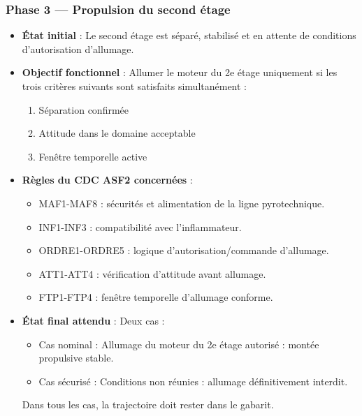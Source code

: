 \subsubsection*{Phase 3 — Propulsion du second étage}
\begin{itemize}
    \item \textbf{État initial} : Le second étage est séparé, stabilisé et en attente de conditions d’autorisation d’allumage.
    \item \textbf{Objectif fonctionnel} : Allumer le moteur du 2e étage uniquement si les trois critères suivants sont
    satisfaits simultanément :
    \begin{enumerate}
        \item Séparation confirmée
        \item Attitude dans le domaine acceptable
        \item Fenêtre temporelle active
    \end{enumerate}
    \item \textbf{Règles du \acrshort{CDC} ASF2 concernées} :
    \begin{itemize}
        \item MAF1-MAF8\cite[p. ~68-70]{CDC_BiEtage} : sécurités et alimentation de la ligne pyrotechnique.
        \item INF1-INF3\cite[p. ~73-75]{CDC_BiEtage} : compatibilité avec l’inflammateur.
        \item ORDRE1-ORDRE5\cite[p. ~78-80]{CDC_BiEtage} : logique d’autorisation/commande d’allumage.
        \item ATT1-ATT4\cite[p. ~81-83]{CDC_BiEtage} : vérification d’attitude avant allumage.
        \item FTP1-FTP4\cite[p. ~84-86]{CDC_BiEtage} : fenêtre temporelle d’allumage conforme.
    \end{itemize}
    \item \textbf{État final attendu} : Deux cas :
    \begin{itemize}
        \item Cas nominal : Allumage du moteur du 2e étage autorisé : montée propulsive stable.
        \item Cas sécurisé : Conditions non réunies : allumage définitivement interdit.
    \end{itemize}
    Dans tous les cas, la trajectoire doit rester dans le gabarit.
\end{itemize}

\newpage


